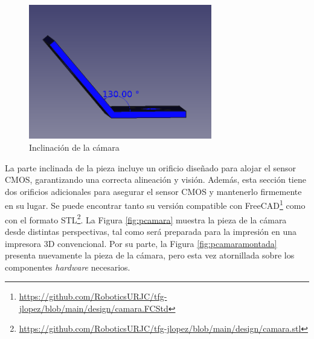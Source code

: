 \begin{figure} [h!]
	\begin{center}
		\includegraphics[width=8cm]{figs/cap5/rot.png}
	\end{center}
	\caption{Inclinación de la cámara} 
\label{fig:rot}
\end{figure}

La parte inclinada de la pieza incluye un orificio diseñado para alojar el sensor CMOS, garantizando una correcta alineación y visión. Además, esta sección tiene dos orificios adicionales para asegurar el sensor CMOS y mantenerlo firmemente en su lugar. Se puede encontrar tanto su versión compatible con FreeCAD\footnote{\url{https://github.com/RoboticsURJC/tfg-jlopez/blob/main/design/camara.FCStd}} como con el formato STL\footnote{\url{https://github.com/RoboticsURJC/tfg-jlopez/blob/main/design/camara.stl}}. La Figura \ref{fig:pcamara} muestra la pieza de la cámara desde distintas perspectivas, tal como será preparada para la impresión en una impresora 3D convencional. Por su parte, la Figura \ref{fig:pcamaramontada} presenta nuevamente la pieza de la cámara, pero esta vez atornillada sobre los componentes \textit{hardware} necesarios. 


